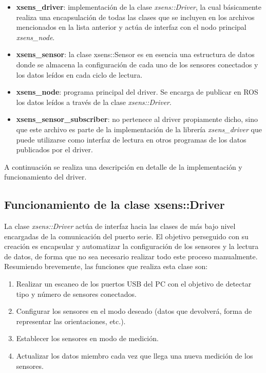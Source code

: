 \documentclass[12pt, a4paper]{report}
\begin{document}
\begin{itemize}
\item \textbf{xsens\_driver}: implementación de la clase \textit{xsens::Driver}, la cual básicamente realiza una encapsulación de todas las clases que se incluyen en los archivos mencionados en la lista anterior y actúa de interfaz con el nodo principal \textit{xsens\_node}.
\item \textbf{xsens\_sensor}: la clase xsens::Sensor es en esencia una estructura de datos donde se almacena la configuración de cada uno de los sensores conectados y los datos leídos en cada ciclo de lectura.
\item \textbf{xsens\_node}: programa principal del driver. Se encarga de publicar en ROS los datos leídos a través de la clase \textit{xsens::Driver}.
\item \textbf{xsens\_sensor\_subscriber}: no pertenece al driver propiamente dicho, sino que este archivo es parte de la implementación de la librería \textit{xsens\_driver} que puede utilizarse como interfaz de lectura en otros programas de los datos publicados por el driver.
\end{itemize}

A continuación se realiza una descripción en detalle de la implementación y funcionamiento del driver.

\subsection{Funcionamiento de la clase xsens::Driver}

La clase \textit{xsens::Driver} actúa de interfaz hacia las clases de más bajo nivel encargadas de la comunicación del puerto serie. El objetivo perseguido con su creación es encapsular y automatizar la configuración de los sensores y la lectura de datos, de forma que no sea necesario realizar todo este proceso manualmente. Resumiendo brevemente, las funciones que realiza esta clase son:

\begin{enumerate}

\item Realizar un escaneo de los puertos USB del PC con el objetivo de detectar tipo y número de sensores conectados.

\item Configurar los sensores en el modo deseado (datos que devolverá, forma de representar las orientaciones, etc.).

\item Establecer los sensores en modo de medición.

\item Actualizar los datos miembro cada vez que llega una nueva medición de los sensores.

\end{enumerate}
\end{document}
